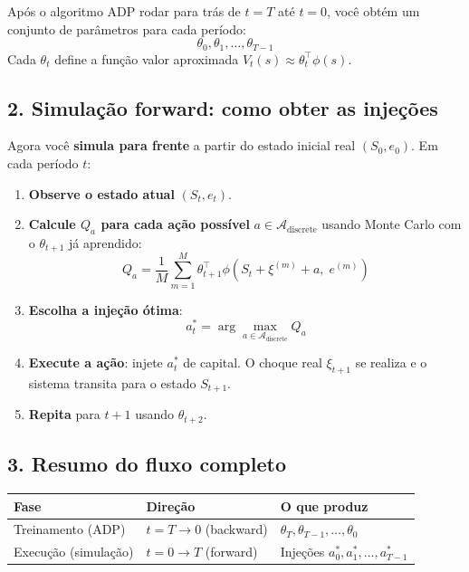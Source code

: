 \documentclass[12pt,a4paper]{article}
\begin{document}
Após o algoritmo ADP rodar para trás de $t = T$ até $t = 0$, você obtém um conjunto de parâmetros para cada período:
\begin{equation}
    \theta_0, \theta_1, \ldots, \theta_{T-1}
\end{equation}
Cada $\theta_t$ define a função valor aproximada $V_t(s) \approx \theta_t^\top \phi(s)$.

\subsection{2. Simulação forward: como obter as injeções}

Agora você \textbf{simula para frente} a partir do estado inicial real $(S_0, e_0)$. Em cada período $t$:

\begin{enumerate}
    \item \textbf{Observe o estado atual} $(S_t, e_t)$.

    \item \textbf{Calcule $Q_a$ para cada ação possível} $a \in \mathcal{A}_{\text{discrete}}$ usando Monte Carlo com o $\theta_{t+1}$ já aprendido:
    \begin{equation}
        Q_a = \frac{1}{M}\sum_{m=1}^{M} \theta_{t+1}^\top \phi\!\left(S_t + \xi^{(m)} + a,\; e^{(m)}\right)
    \end{equation}

    \item \textbf{Escolha a injeção ótima}:
    \begin{equation}
        a_t^* = \arg\max_{a \in \mathcal{A}_{\text{discrete}}} Q_a
    \end{equation}

    \item \textbf{Execute a ação}: injete $a_t^*$ de capital. O choque real $\xi_{t+1}$ se realiza e o sistema transita para o estado $S_{t+1}$.

    \item \textbf{Repita} para $t+1$ usando $\theta_{t+2}$.
\end{enumerate}

\subsection{3. Resumo do fluxo completo}

\begin{center}
\begin{tabular}{lll}
\hline
\textbf{Fase} & \textbf{Direção} & \textbf{O que produz} \\
\hline
Treinamento (ADP) & $t = T \to 0$ (backward) & $\theta_T, \theta_{T-1}, \ldots, \theta_0$ \\
Execução (simulação) & $t = 0 \to T$ (forward) & Injeções $a_0^*, a_1^*, \ldots, a_{T-1}^*$ \\
\hline
\end{tabular}
\end{center}
\end{document}
